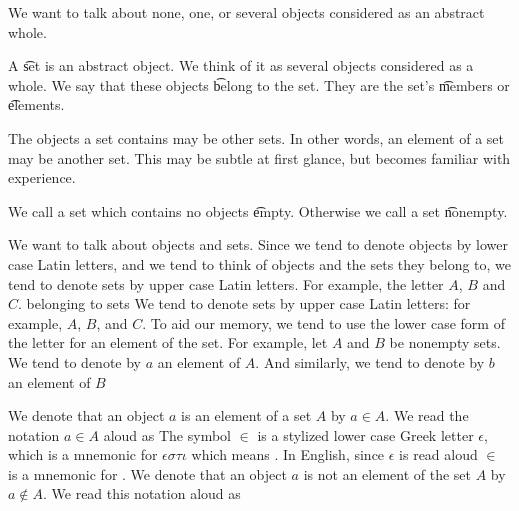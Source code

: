

We want to talk about none, one, or several objects considered as an abstract whole.


A \t{set} is an abstract object.
We think of it as several objects considered as a whole.
We say that these objects \t{belong} to the set.
They are the set's \t{members} or \t{elements}.

The objects a set contains may be other sets.
In other words, an element of a set may be another set.
This may be subtle at first glance, but becomes familiar with experience.

We call a set which contains no objects \t{empty}.
Otherwise we call a set \t{nonempty}.


We want to talk about objects and sets.
Since we tend to denote objects by lower case Latin letters, and we tend to think of objects and the sets they belong to, we tend to denote sets by upper case Latin letters.
For example, the letter $A$, $B$ and $C$.
belonging to sets
We tend to denote sets by upper case Latin letters: for example, $A$, $B$, and $C$.
To aid our memory, we tend to use the lower case form of the letter for an element of the set.
For example, let $A$ and $B$ be nonempty sets.
We tend to denote by $a$ an element of $A$. And similarly, we tend to denote by $b$ an element of $B$

We denote that an object $a$ is an element of a set $A$ by $a \in A$.
We read the notation $a \in A$ aloud as 
The symbol $\in$ is a stylized lower case Greek letter $\epsilon$, which is a mnemonic for $\epsilon \sigma \tau \iota$ which means .
In English, since $\epsilon$ is read aloud  $\in$ is a mnemonic for .
We denote that an object $a$ is not an element of the set $A$ by $a \not\in A$.
We read this notation aloud as 
%
%

